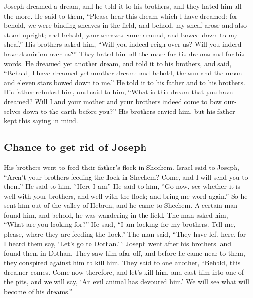 \begin{paracol}{2}
\begin{otherlanguage}{english}
 Joseph dreamed a dream, and he told it to his brothers,
and they hated him all the more.  He said to them,
``Please hear this dream which I have dreamed:  for
behold, we were binding sheaves in the field, and behold, my sheaf arose
and also stood upright; and behold, your sheaves came around, and bowed
down to my sheaf.''  His brothers asked him, ``Will you
indeed reign over us? Will you indeed have dominion over us?'' They
hated him all the more for his dreams and for his words. 
He dreamed yet another dream, and told it to his brothers, and said,
``Behold, I have dreamed yet another dream: and behold, the sun and the
moon and eleven stars bowed down to me.''  He told it to
his father and to his brothers. His father rebuked him, and said to him,
``What is this dream that you have dreamed? Will I and your mother and
your brothers indeed come to bow ourselves down to the earth before
you?''  His brothers envied him, but his father kept this
saying in mind.

\hypertarget{chance-to-get-rid-of-joseph}{%
\subsection{Chance to get rid of
Joseph}\label{chance-to-get-rid-of-joseph}}

 His brothers went to feed their father's flock in
Shechem.  Israel said to Joseph, ``Aren't your brothers
feeding the flock in Shechem? Come, and I will send you to them.'' He
said to him, ``Here I am.''  He said to him, ``Go now,
see whether it is well with your brothers, and well with the flock; and
bring me word again.'' So he sent him out of the valley of Hebron, and
he came to Shechem.  A certain man found him, and behold,
he was wandering in the field. The man asked him, ``What are you looking
for?''  He said, ``I am looking for my brothers. Tell me,
please, where they are feeding the flock.''  The man
said, ``They have left here, for I heard them say, `Let's go to
Dothan.'\,'' Joseph went after his brothers, and found them in Dothan.
 They saw him afar off, and before he came near to them,
they conspired against him to kill him.  They said to one
another, ``Behold, this dreamer comes.  Come now
therefore, and let's kill him, and cast him into one of the pits, and we
will say, `An evil animal has devoured him.' We will see what will
become of his dreams.''


\end{otherlanguage}
\end{paracol}
